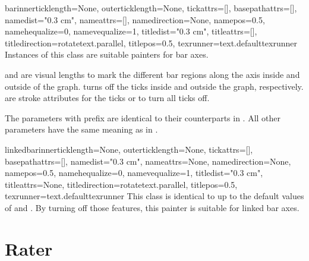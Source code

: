 \begin{classdesc}{bar}{innerticklength=None,
                       outerticklength=None,
                       tickattrs=[],
                       basepathattrs=[],
                       namedist="0.3 cm",
                       nameattrs=[],
                       namedirection=None,
                       namepos=0.5,
                       namehequalize=0,
                       namevequalize=1,
                       titledist="0.3 cm",
                       titleattrs=[],
                       titledirection=rotatetext.parallel,
                       titlepos=0.5,
                       texrunner=text.defaulttexrunner}
  Instances of this class are suitable painters for bar axes.

   and  are visual \PyX{}
  lengths to mark the different bar regions along the axis inside and
  outside of the graph.  turns off the ticks inside and
  outside the graph, respectively.  are stroke
  attributes for the ticks or  to turn all ticks off.

  The parameters with prefix  are identical to their
   counterparts in . All other parameters have
  the same meaning as in .
\end{classdesc}

\begin{classdesc}{linkedbar}{innerticklength=None,
                             outerticklength=None,
                             tickattrs=[],
                             basepathattrs=[],
                             namedist="0.3 cm",
                             nameattrs=None,
                             namedirection=None,
                             namepos=0.5,
                             namehequalize=0,
                             namevequalize=1,
                             titledist="0.3 cm",
                             titleattrs=None,
                             titledirection=rotatetext.parallel,
                             titlepos=0.5,
                             texrunner=text.defaulttexrunner}
  This class is identical to  up to the default values of
   and . By turning off those features,
  this painter is suitable for linked bar axes.
\end{classdesc}

\section{Rater}

